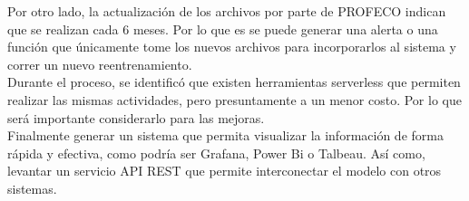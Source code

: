 \documentclass{article}
\begin{document}
Por otro lado, la actualización de los archivos por parte de PROFECO indican que se realizan cada 6 meses. Por lo que es se puede generar una alerta o una función que únicamente tome los nuevos archivos para incorporarlos al sistema y correr un nuevo reentrenamiento. \\

Durante el proceso, se identificó que existen herramientas serverless que permiten realizar las  mismas actividades, pero presuntamente a un menor costo. Por lo que será importante considerarlo para las mejoras.\\

Finalmente generar un sistema que permita visualizar la información de forma rápida y efectiva, como podría ser Grafana, Power Bi o Talbeau. Así como, levantar un servicio API REST que permite interconectar el modelo con otros sistemas. 

% 
% 
\end{document}
